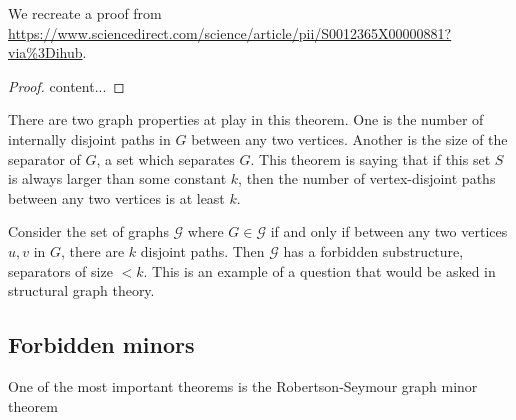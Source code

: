 \documentclass[]{article}
\theoremstyle{definition}
\numberwithin{theorem}{section}
\numberwithin{equation}{section}
\begin{document}
We recreate a proof from \url{https://www.sciencedirect.com/science/article/pii/S0012365X00000881?via%3Dihub}.
\begin{proof}
	content...
\end{proof}
There are two graph properties at play in this theorem. One is the number of internally disjoint paths in $G$ between any two vertices. Another is the size of the separator of $G$, a set which separates $G$. This theorem is saying that if this set $S$ is always larger than some constant $k$, then the number of vertex-disjoint paths between any two vertices is at least $k$. 

Consider the set of graphs $\mathcal{G}$ where $G \in \mathcal{G}$ if and only if between any two vertices $u, v$ in $G$, there are $k$ disjoint paths. Then $\mathcal{G}$ has a forbidden substructure, separators of size $< k$. This is an example of a question that would be asked in structural graph theory.

\subsection{Forbidden minors}
One of the most important theorems is the Robertson-Seymour graph minor theorem
\end{document}

